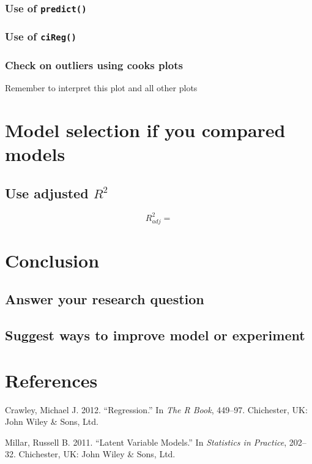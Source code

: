 \documentclass[]{article}
\begin{document}
\subsubsection{\texorpdfstring{Use of
\texttt{predict()}}{Use of predict()}}\label{use-of-predict}

\subsubsection{\texorpdfstring{Use of
\texttt{ciReg()}}{Use of ciReg()}}\label{use-of-cireg}

\subsubsection{Check on outliers using cooks
plots}\label{check-on-outliers-using-cooks-plots}

Remember to interpret this plot and all other plots

\section{Model selection if you compared
models}\label{model-selection-if-you-compared-models}

\subsection{\texorpdfstring{Use adjusted
\(R^2\)}{Use adjusted R\^{}2}}\label{use-adjusted-r2}

\[R_{adj}^2 =\]

\section{Conclusion}\label{conclusion}

\subsection{Answer your research
question}\label{answer-your-research-question}

\subsection{Suggest ways to improve model or
experiment}\label{suggest-ways-to-improve-model-or-experiment}

\section*{References}\label{references}

\hypertarget{refs}{}
\hypertarget{ref-crawley}{}
Crawley, Michael J. 2012. ``Regression.'' In \emph{The R Book}, 449--97.
Chichester, UK: John Wiley \& Sons, Ltd.

\hypertarget{ref-millar}{}
Millar, Russell B. 2011. ``Latent Variable Models.'' In \emph{Statistics
in Practice}, 202--32. Chichester, UK: John Wiley \& Sons, Ltd.
\end{document}
